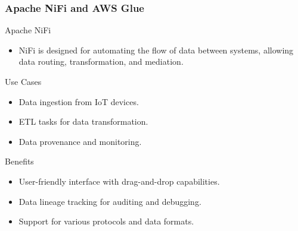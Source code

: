 \documentclass{beamer}
\begin{document}
\begin{frame}[fragile]
    \frametitle{Apache NiFi and AWS Glue}
    \begin{block}{Apache NiFi}
        \begin{itemize}
            \item NiFi is designed for automating the flow of data between systems, allowing data routing, transformation, and mediation.
        \end{itemize}
        
        \begin{block}{Use Cases}
            \begin{itemize}
                \item Data ingestion from IoT devices.
                \item ETL tasks for data transformation.
                \item Data provenance and monitoring.
            \end{itemize}
        \end{block}
        
        \begin{block}{Benefits}
            \begin{itemize}
                \item User-friendly interface with drag-and-drop capabilities.
                \item Data lineage tracking for auditing and debugging.
                \item Support for various protocols and data formats.
            \end{itemize}
        \end{block}
    \end{block}
\end{frame}
\end{document}
